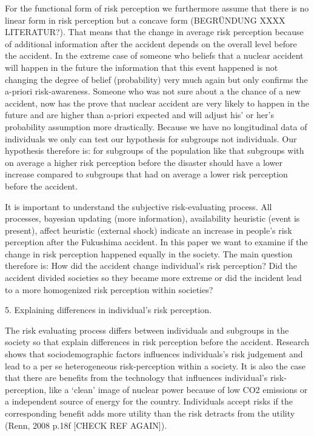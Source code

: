 For the functional form of risk perception we furthermore assume that there is no linear form in risk perception but a concave form (BEGRÜNDUNG XXXX LITERATUR?). That means that the change in average risk perception because of additional information after the accident depends on the overall level before the accident. In the extreme case of someone who beliefs that a nuclear accident will happen in the future the information that this event happened is not changing the degree of belief (probability) very much again but only confirms the a-priori risk-awareness. Someone who was not sure about a the chance of a new accident, now has the prove that nuclear accident are very likely to happen in the future and are higher than a-priori expected and will adjust his' or her's probability assumption more drastically.  Because we have no longitudinal data of individuals we only can test our hypothesis for subgroups not individuals. Our hypothesis therefore is: for subgroups of the population like that subgroups with on average a higher risk perception before the disaster should have a lower increase  compared to subgroups that had on average a lower risk perception before the accident. 

It is important to understand the subjective risk-evaluating process.  All processes, bayesian updating (more information), availability heuristic (event is present),  affect heuristic (external shock) indicate an increase in people's risk perception after the Fukushima accident. 
In this paper we want to examine if the change in risk perception happened equally in the society. The main question therefore is: How did the accident change individual's risk perception? Did the accident divided societies so they became more extreme or did the incident lead to a more homogenized risk perception within societies?


    
5. Explaining differences in individual's risk perception. 

The risk evaluating process differs between individuals and subgroups in the society so that explain differences in risk perception before the accident. Research shows that sociodemographic factors influences individuals's risk judgement and lead to a per se heterogeneous risk-perception within a society. It is also the case that there are benefits from the technology that influences individual's risk-perception, like a `clean' image of nuclear power because of low CO2 emissions or a independent source of energy for the country. Individuals accept risks if the corresponding benefit adds more utility than the risk detracts from the utility (Renn, 2008 p.18f [CHECK REF AGAIN]).
 
